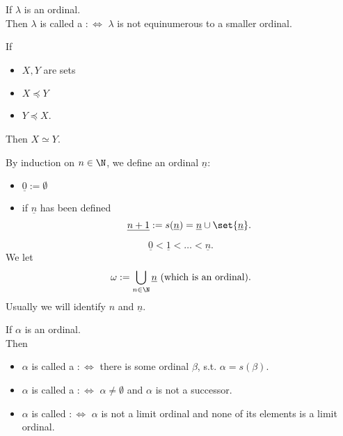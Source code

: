 \begin{definition}
    If $\lambda$ is an ordinal.\\
    Then $\lambda$ is called a  $:\iff$ $\lambda$ is not equinumerous to a smaller ordinal.
\end{definition}

\begin{theorem}
    If
    \begin{itemize}
        \item $X,Y$ are sets
        \item $X \preceq Y$
        \item $Y \preceq X$.
    \end{itemize}
    Then $X \simeq Y$.
\end{theorem}

\begin{notation}
    By induction on $n \in \N$, we define an ordinal $\underline{n}$:
    \begin{itemize}
        \item $\underline{0} := \emptyset$
        \item if $\underline{n}$ has been defined
        $$ \underline{n+1} := s(\underline{n}) = \underline{n} \cup \set{\underline{n}}.$$
    \end{itemize}
\end{notation}

\begin{remark}
    $$\underline{0} < \underline{1} < \ldots < \underline{n}.$$
    We let 
    $$ \omega := \bigcup_{n \in \N}\underline{n} \text{ (which is an ordinal)}.$$
    Usually we will identify $n$ and $\underline{n}$.
\end{remark}

\begin{definition}
    If $\alpha$ is an ordinal.\\
    Then 
    \begin{itemize}
        \item $\alpha$ is called a  $:\iff$ there is some ordinal $\beta$, s.t. $\alpha = s(\beta)$.
        \item $\alpha$ is called a  $:\iff$ $\alpha \ne \emptyset$ and $\alpha$ is not a successor.
        \item $\alpha$ is called  $:\iff$ $\alpha$ is not a limit ordinal and none of its elements is a limit ordinal.
    \end{itemize}
\end{definition}

